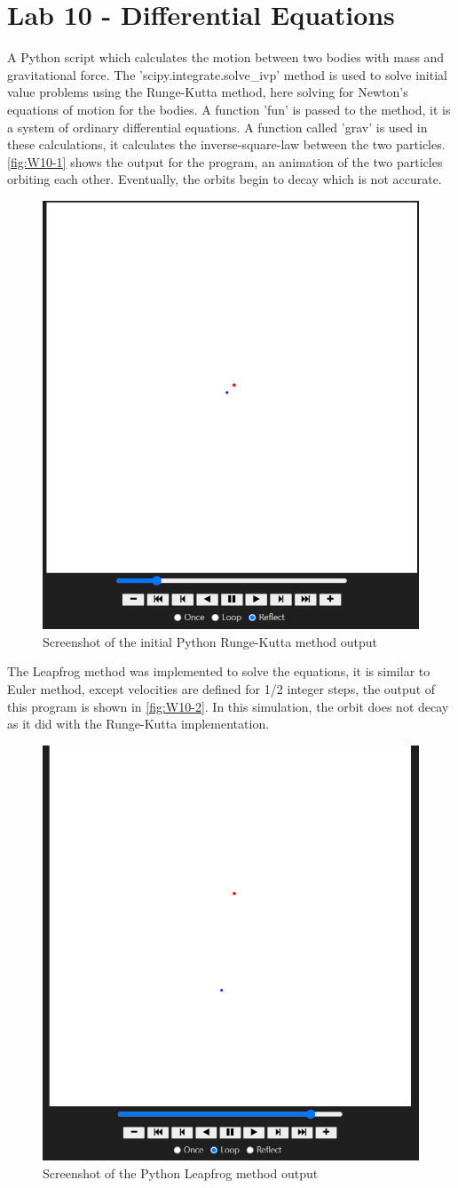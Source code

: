 \newpage
\section{Lab 10 - Differential Equations}
A Python script which calculates the motion between two bodies with mass and gravitational force. The 'scipy.integrate.solve{\_}ivp' method is used to solve initial value problems using the Runge-Kutta method, here solving for Newton's equations of motion for the bodies. A function 'fun' is passed to the method, it is a system of ordinary differential equations. A function called 'grav' is used in these calculations, it calculates the inverse-square-law between the two particles. \autoref{fig:W10-1} shows the output for the program, an animation of the two particles orbiting each other. Eventually, the orbits begin to decay which is not accurate.

\begin{figure}[H] 
    \centering
    \includegraphics[width=0.49\columnwidth]{Figures/Week 10/1.png}
    \caption{Screenshot of the initial Python Runge-Kutta method output}
    \label{fig:W10-1}
\end{figure}

The Leapfrog method was implemented to solve the equations, it is similar to Euler method, except velocities are defined for 1/2 integer steps, the output of this program is shown in \autoref{fig:W10-2}. In this simulation, the orbit does not decay as it did with the Runge-Kutta implementation.
\begin{figure}[H] 
    \centering
    \includegraphics[width=0.49\columnwidth]{Figures/Week 10/2.png}
    \caption{Screenshot of the Python Leapfrog method output}
    \label{fig:W10-2}
\end{figure}

